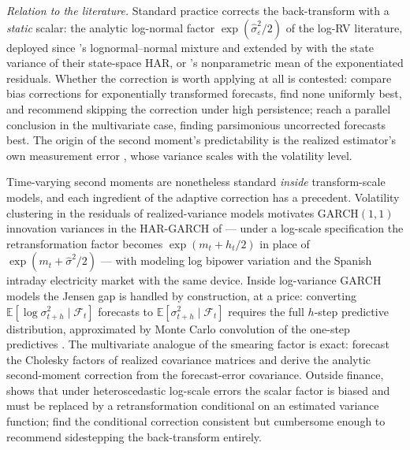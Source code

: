 \emph{Relation to the literature.} Standard practice corrects the
back-transform with a \emph{static} scalar: the analytic log-normal
factor $\exp(\hat\sigma^2_\varepsilon / 2)$ of the log-RV literature,
deployed since \citet{AndersenBollerslevDieboldLabys2003}'s
lognormal--normal mixture and extended by \citet{BekiermanManner2018}
with the state variance of their state-space HAR, or
\citet{Duan1983}'s nonparametric mean of the exponentiated residuals.
Whether the correction is worth applying at all is contested:
\citet{DemetrescuGolosnoyTitova2020} compare bias corrections for
exponentially transformed forecasts, find none uniformly best, and
recommend skipping the correction under high persistence;
\citet{HalbleibVoev2011} reach a parallel conclusion in the
multivariate case, finding parsimonious uncorrected forecasts best.
The origin of the second moment's predictability is the realized
estimator's own measurement error
\citep{AsaiMcAleerMedeiros2012}, whose variance scales with the
volatility level.

Time-varying second moments are nonetheless standard \emph{inside}
transform-scale models, and each ingredient of the adaptive correction
has a precedent. Volatility clustering in the residuals of
realized-variance models motivates GARCH$(1,1)$ innovation variances
in the HAR-GARCH of \citet{CorsiMittnikPigorschPigorsch2008} ---
under a log-scale specification the retransformation factor becomes
$\exp(m_t + h_t/2)$ in place of $\exp(m_t + \hat\sigma^2/2)$ ---
with \citet{BollerslevKretschmerPigorschTauchen2009} modeling log
bipower variation and \citet{CiarretaZarraga2016} the Spanish
intraday electricity market with the same device. Inside log-variance
GARCH models the Jensen gap is handled by construction, at a price:
converting $\mathbb{E}[\log \sigma^2_{t+h} \mid \mathcal{F}_t]$
forecasts to $\mathbb{E}[\sigma^2_{t+h} \mid \mathcal{F}_t]$ requires
the full $h$-step predictive distribution, approximated by Monte Carlo
convolution of the one-step predictives
\citep{AndersenBollerslevChristoffersenDiebold2006}. The multivariate
analogue of the smearing factor is exact: \citet{ChiriacVoev2011}
forecast the Cholesky factors of realized covariance matrices and
derive the analytic second-moment correction from the forecast-error
covariance. Outside finance, \citet{Manning1998} shows that under
heteroscedastic log-scale errors the scalar \citet{Duan1983} factor is
biased and must be replaced by a retransformation conditional on an
estimated variance function; \citet{ManningMullahy2001} find the
conditional correction consistent but cumbersome enough to recommend
sidestepping the back-transform entirely.

